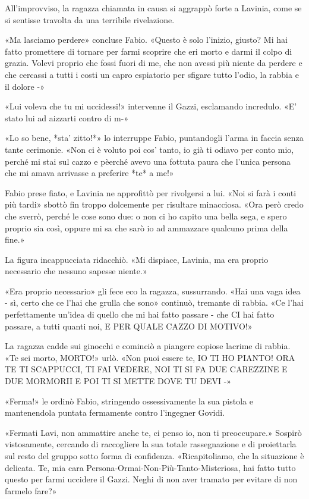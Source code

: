 All'improvviso, la ragazza chiamata in causa si aggrappò forte a Lavinia, come se si sentisse travolta da una terribile rivelazione.

«Ma lasciamo perdere» concluse Fabio. «Questo è solo l'inizio, giusto? Mi hai fatto promettere di tornare per farmi scoprire che eri morto e darmi il colpo di grazia. Volevi proprio che fossi fuori di me, che non avessi più niente da perdere e che cercassi a tutti i costi un capro espiatorio per sfigare tutto l'odio, la rabbia e il dolore -»

«Lui voleva che tu mi uccidessi!» intervenne il Gazzi, esclamando incredulo. «E' stato lui ad aizzarti contro di m-»

«Lo so bene, *sta' zitto!*» lo interruppe Fabio, puntandogli l'arma in faccia senza tante cerimonie. «Non ci è voluto poi cos' tanto, io già ti odiavo per conto mio, perché mi stai sul cazzo e pèerché avevo una fottuta paura che l'unica persona che mi amava arrivasse a preferire *te* a me!»

Fabio prese fiato, e Lavinia ne approfittò per rivolgersi a lui. «Noi si farà i conti più tardi» sbottò fin troppo dolcemente per risultare minacciosa. «Ora però credo che sverrò, perché le cose sono due: o non ci ho capito una bella sega, e spero proprio sia così, oppure mi sa che sarò io ad ammazzare qualcuno prima della fine.»

La figura incappucciata ridacchiò. «Mi dispiace, Lavinia, ma era proprio necessario che nessuno sapesse niente.»

«Era proprio necessario» gli fece eco la ragazza, sussurrando. «Hai una vaga idea - sì, certo che ce l'hai che grulla che sono» continuò, tremante di rabbia. «Ce l'hai perfettamente un'idea di quello che mi hai fatto passare - che CI hai fatto passare, a tutti quanti noi, E PER QUALE CAZZO DI MOTIVO!» 

La ragazza cadde sui ginocchi e cominciò a piangere copiose lacrime di rabbia. «Te sei morto, MORTO!» urlò. «Non puoi essere te, IO TI HO PIANTO! ORA TE TI SCAPPUCCI, TI FAI VEDERE, NOI TI SI FA DUE CAREZZINE E DUE MORMORII E POI TI SI METTE DOVE TU DEVI -»

«Ferma!» le ordinò Fabio, stringendo ossessivamente la sua pistola e mantenendola puntata fermamente contro l'ingegner Govidi. 

«Fermati Lavi, non ammattire anche te, ci penso io, non ti preoccupare.» Sospirò vistosamente, cercando di raccogliere la sua totale rassegnazione e di proiettarla sul resto del gruppo sotto forma di confidenza. «Ricapitoliamo, che la situazione è delicata. Te, mia cara Persona-Ormai-Non-Più-Tanto-Misteriosa, hai fatto tutto questo per farmi uccidere il Gazzi. Neghi di non aver tramato per evitare di non farmelo fare?»

